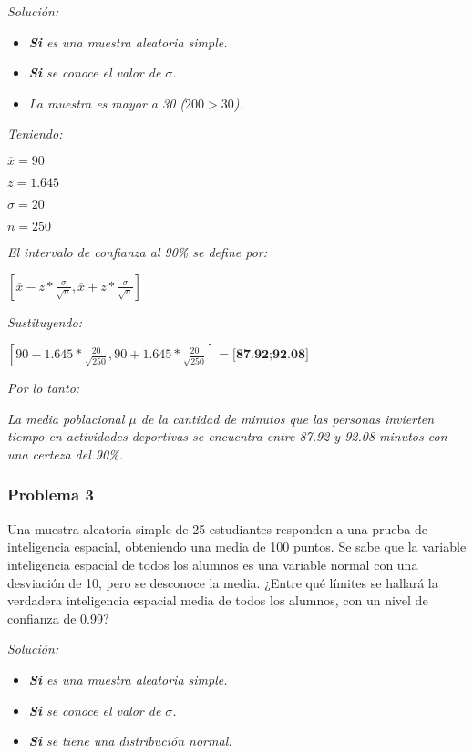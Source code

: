 \documentclass[a4paper, 12pt]{article}
\begin{document}
\emph{Solución:}

\begin{itemize}
    \item \emph{\textbf{Si} es una muestra aleatoria simple.}
    \item \emph{\textbf{Si} se conoce el valor de $\sigma$.}
    \item \emph{La muestra es mayor a 30 ($200>30$).}
\end{itemize}

\emph{Teniendo:}

$\overline{x}=90$

$z=1.645$

$\sigma=20$

$n=250$

\emph{El intervalo de confianza al 90\% se define por:}

$[\overline{x}-z*\frac{\sigma}{\sqrt{n}}, \overline{x}+z*\frac{\sigma}{\sqrt{n}}]$

\emph{Sustituyendo:}

$[90-1.645*\frac{20}{\sqrt{250}}, 90+1.645*\frac{20}{\sqrt{250}}]=\textbf{[87.92;92.08]}$

\emph{Por lo tanto:}

\emph{La media poblacional $\mu$ de la cantidad de minutos que las personas invierten tiempo en actividades deportivas se encuentra entre 87.92 y 92.08 minutos con una certeza del 90\%.}

\subsubsection{Problema 3}
Una muestra aleatoria simple de 25 estudiantes responden a una prueba de inteligencia espacial, obteniendo una media de 100 puntos. Se sabe que la variable inteligencia espacial de todos los alumnos es una variable normal con una desviación de 10, pero se desconoce la media. ¿Entre qué límites se hallará la verdadera inteligencia espacial media de todos los alumnos, con un nivel de confianza de 0.99?

\emph{Solución:}

\begin{itemize}
    \item \emph{\textbf{Si} es una muestra aleatoria simple.}
    \item \emph{\textbf{Si} se conoce el valor de $\sigma$.}
    \item \emph{\textbf{Si} se tiene una distribución normal.}
\end{itemize}
\end{document}
